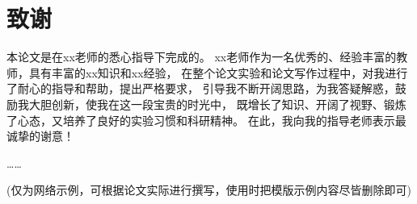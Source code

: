 \chapter{致谢}
本论文是在xx老师的悉心指导下完成的。
xx老师作为一名优秀的、经验丰富的教师，具有丰富的xx知识和xx经验，
在整个论文实验和论文写作过程中，对我进行了耐心的指导和帮助，提出严格要求，
引导我不断开阔思路，为我答疑解惑，鼓励我大胆创新，使我在这一段宝贵的时光中，
既增长了知识、开阔了视野、锻炼了心态，又培养了良好的实验习惯和科研精神。
在此，我向我的指导老师表示最诚挚的谢意！

……

(仅为网络示例，可根据论文实际进行撰写，使用时把模版示例内容尽皆删除即可)
